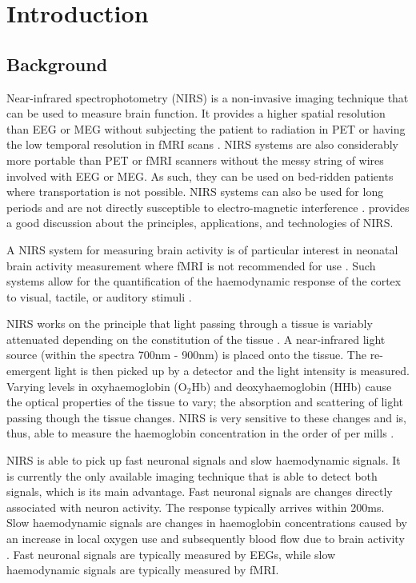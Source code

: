 \chapter{Introduction}
\section{Background}
Near-infrared spectrophotometry (NIRS) is a non-invasive imaging technique that can be used to measure brain function. It provides a higher spatial resolution than EEG or MEG without subjecting the patient to radiation in PET or having the low temporal resolution in fMRI scans \cite{wolf08}. NIRS systems are also considerably more portable than PET or fMRI scanners without the messy string of wires involved with EEG or MEG. As such, they can be used on bed-ridden patients where transportation is not possible. NIRS systems can also be used for long periods and are not directly susceptible to electro-magnetic interference  \cite{wolf08}.  \cite{wolf08} provides a good discussion about the principles, applications, and technologies of NIRS. 

A NIRS system for measuring brain activity is of particular interest in neonatal brain activity measurement where fMRI is not recommended for use \cite{wolf08}. Such systems allow for the quantification of the haemodynamic response of the cortex to visual, tactile, or auditory stimuli \cite{mini08}.  

NIRS works on the principle that light passing through a tissue is variably attenuated depending on the constitution of the tissue \cite{wolf08}. A near-infrared light source (within the spectra 700nm - 900nm) is placed onto the tissue. The re-emergent light is then picked up by a detector and the light intensity is measured. Varying levels in oxyhaemoglobin (O$_{2}$Hb) and  deoxyhaemoglobin (HHb) cause the optical properties of the tissue to vary; the absorption and scattering of light passing though the tissue changes. NIRS is very sensitive to these changes and is, thus, able to measure the haemoglobin concentration in the order of per mills \cite{wolf05}.

NIRS is able to pick up fast neuronal signals and slow haemodynamic signals. It is currently the only available imaging technique that is able to detect both signals, which is its main advantage. Fast neuronal signals are changes directly associated with neuron activity. The response typically arrives within 200ms. Slow haemodynamic signals are changes in haemoglobin concentrations caused by an increase in local oxygen use and subsequently blood flow due to brain activity \cite{mini08}. Fast neuronal signals are typically measured by EEGs, while slow haemodynamic signals are typically measured by fMRI.


